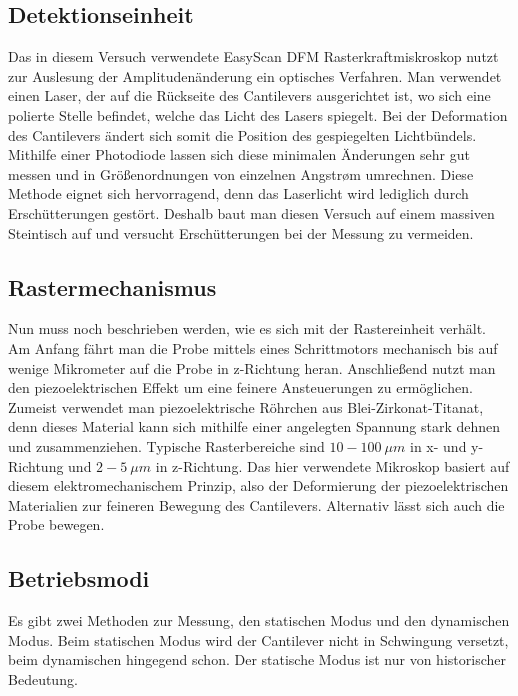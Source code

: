  \subsection{Detektionseinheit}
 
 Das in diesem Versuch verwendete EasyScan DFM Rasterkraftmiskroskop nutzt zur Auslesung der Amplitudenänderung ein optisches Verfahren. 
 Man verwendet einen Laser, der auf die Rückseite des Cantilevers ausgerichtet ist, wo sich eine polierte Stelle befindet, welche das Licht des Lasers spiegelt.
 Bei der Deformation des Cantilevers ändert sich somit die Position des gespiegelten Lichtbündels.
 Mithilfe einer Photodiode lassen sich diese minimalen Änderungen sehr gut messen und in Größenordnungen von einzelnen Angstrøm umrechnen.
 Diese Methode eignet sich hervorragend, denn das Laserlicht wird lediglich durch Erschütterungen gestört.
 Deshalb baut man diesen Versuch auf einem massiven Steintisch auf und versucht Erschütterungen bei der Messung zu vermeiden.

\subsection{Rastermechanismus}

Nun muss noch beschrieben werden, wie es sich mit der Rastereinheit verhält.
Am Anfang fährt man die Probe mittels eines Schrittmotors mechanisch bis auf wenige Mikrometer auf die Probe in z-Richtung heran.
Anschließend nutzt man den piezoelektrischen Effekt um eine feinere Ansteuerungen zu ermöglichen.
Zumeist verwendet man piezoelektrische Röhrchen aus Blei-Zirkonat-Titanat, denn dieses Material kann sich mithilfe einer angelegten Spannung stark dehnen und zusammenziehen. 
Typische Rasterbereiche sind $10-\SI{100}{\mu m}$ in x- und y-Richtung und $2-\SI{5}{\mu m}$ in z-Richtung.
Das hier verwendete Mikroskop basiert auf diesem elektromechanischem Prinzip, also der Deformierung der piezoelektrischen Materialien zur feineren Bewegung des Cantilevers.
Alternativ lässt sich auch die Probe bewegen.

\subsection{Betriebsmodi}

Es gibt zwei Methoden zur Messung, den statischen Modus und den dynamischen Modus. Beim statischen Modus wird der Cantilever nicht in Schwingung versetzt, beim dynamischen hingegend schon. Der statische Modus ist nur von historischer Bedeutung.

